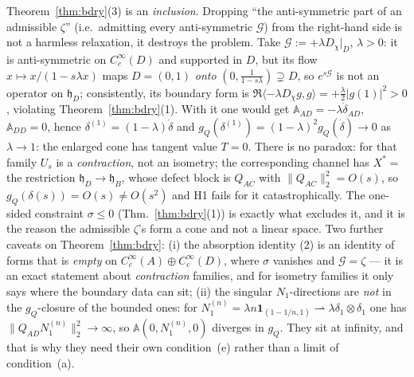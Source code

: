 \documentclass[11pt]{article}
\newcommand{\hh}{\mathfrak h}
\newcommand{\Aop}{\mathbb A}
\begin{document}
\begin{remark}\label{rem:coneT0}
Theorem~\ref{thm:bdry}(3) is an \emph{inclusion}.  Dropping ``the anti-symmetric part of an admissible $\zeta$'' (i.e.\ admitting every anti-symmetric $\mathcal G$)
from the right-hand side is not a harmless relaxation, it destroys the problem.  Take
$\mathcal G:=+\lambda D_\chi|_D$, $\lambda>0$: it is anti-symmetric on $C_c^\infty(D)$ and
supported in $D$, but its flow $x\mapsto x/(1-s\lambda x)$ maps $D=(0,1)$ \emph{onto}
$(0,\frac1{1-s\lambda})\supsetneq D$, so $e^{s\mathcal G}$ is not an operator on $\hh_D$;
consistently, its boundary form is $\Re\langle-\lambda D_\chi g,g\rangle=+\frac\lambda2|g(1)|^2>0$,
violating Theorem~\ref{thm:bdry}(1).  With it one would get $\Aop_{AD}=-\lambda\dot\delta_{AD}$,
$\Aop_{DD}=0$, hence $\delta^{(1)}=(1-\lambda)\dot\delta$ and
$g_Q(\delta^{(1)})=(1-\lambda)^2g_Q(\dot\delta)\to0$ as $\lambda\to1$: the enlarged cone has
tangent value $T=0$.  There is no paradox: for that family $U_s$ is a \emph{contraction},
not an isometry; the corresponding channel has $X^*=$ the restriction $\hh_D\to\hh_B$, whose
defect block is $Q_{AC}$ with $\|Q_{AC}\|_2^2=O(s)$, so $g_Q(\delta(s))=O(s)\ne O(s^2)$ and
H1 fails for it catastrophically.  The one-sided constraint $\sigma\le0$
(Thm.~\ref{thm:bdry}(1)) is exactly what excludes it, and it is the reason the admissible
$\zeta$'s form a cone and not a linear space.  Two further caveats on
Theorem~\ref{thm:bdry}: (i) the absorption identity (2) is an identity of forms that is
\emph{empty} on $C_c^\infty(A)\oplus C_c^\infty(D)$, where $\sigma$ vanishes and
$\mathcal G=\zeta$ --- it is an exact statement about \emph{contraction} families, and for
isometry families it only says where the boundary data can sit; (ii) the singular
$N_1$-directions are \emph{not} in the $g_Q$-closure of the bounded ones: for
$N_1^{(n)}=\lambda n\mathbf 1_{(1-1/n,1)}\rightharpoonup\lambda\delta_1\otimes\delta_1$ one
has $\|Q_{AD}N_1^{(n)}\|_2^2\to\infty$, so $\Aop(0,N_1^{(n)},0)$ diverges in $g_Q$.  They
sit at infinity, and that is why they need their own condition~(e) rather than a limit of
condition~(a).
\end{remark}
\end{document}
